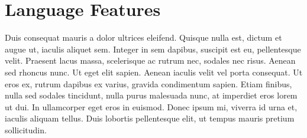 \section{Language Features}
Duis consequat mauris a dolor ultrices eleifend. Quisque nulla est, dictum et augue ut, iaculis aliquet sem. Integer in sem dapibus, suscipit est eu, pellentesque velit. Praesent lacus massa, scelerisque ac rutrum nec, sodales nec risus. Aenean sed rhoncus nunc. Ut eget elit sapien. Aenean iaculis velit vel porta consequat. Ut eros ex, rutrum dapibus ex varius, gravida condimentum sapien. Etiam finibus, nulla sed sodales tincidunt, nulla purus malesuada nunc, at imperdiet eros lorem ut dui. In ullamcorper eget eros in euismod. Donec ipsum mi, viverra id urna et, iaculis aliquam tellus. Duis lobortis pellentesque elit, ut tempus mauris pretium sollicitudin.

